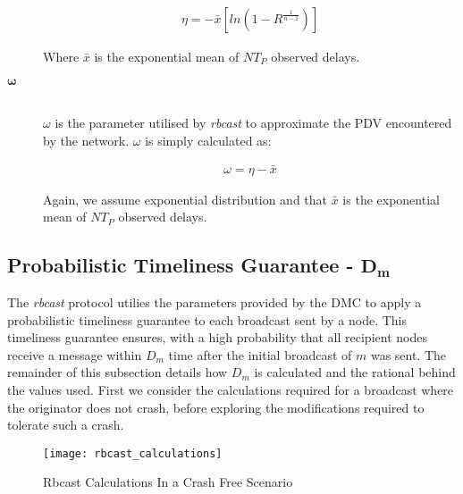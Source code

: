\begin{description}
        \begin{equation*}
            \begin{aligned}
                \eta=-\bar{x}[ln(1-R^{\frac{1}{n-1}})]  
            \end{aligned}
        \end{equation*}
        
Where $\bar{x}$ is the exponential mean of $NT_P$ observed delays.

        \item[\Huge$\boldsymbol{\omega}$] \hfill \\
        $\omega$ is the parameter utilised by \emph{rbcast} to approximate the PDV encountered by the network.  $\omega$ is simply calculated as:
        
        \begin{equation*}
            \begin{aligned}
                \omega = \eta - \bar{x}
            \end{aligned}
        \end{equation*}        
        
        Again, we assume exponential distribution and that $\bar{x}$ is the exponential mean of $NT_P$ observed delays.
        \end{description}

        \subsection*{Probabilistic Timeliness Guarantee - $\boldsymbol{D_m}$}
        The \emph{rbcast} protocol utilies the parameters provided by the DMC to apply a probabilistic timeliness guarantee to each broadcast sent by a node.  This timeliness guarantee ensures, with a high probability that all recipient nodes receive a message within $D_m$ time after the initial broadcast of $m$ was sent.  The remainder of this subsection details how $D_m$ is calculated and the rational behind the values used.  First we consider the calculations required for a broadcast where the originator does not crash, before exploring the modifications required to tolerate such a crash.  

        \begin{figure}[hb]
                \centering    
                \centerline{\texttt{[image: rbcast\_calculations]}}
                \caption[Rbcast Calculations Diagram In a Crash Free Scenario]{Rbcast Calculations In a Crash Free Scenario}
                \label{fig:rbcast_calc}
            \end{figure}    


